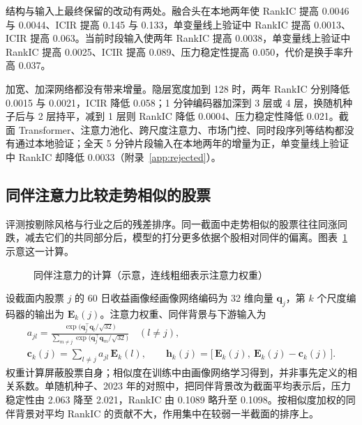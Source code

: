 \documentclass[UTF8,a4paper,zihao=-4,fontset=none]{ctexart}
\newcommand{\figref}[1]{图表~\ref{#1}}
\begin{document}
结构与输入上最终保留的改动有两处。融合头在本地两年使 RankIC 提高 0.0046 与 0.0044、ICIR 提高 0.145 与 0.133，单变量线上验证中 RankIC 提高 0.0013、ICIR 提高 0.063。当前时段输入使两年 RankIC 提高 0.0038，单变量线上验证中 RankIC 提高 0.0025、ICIR 提高 0.089、压力稳定性提高 0.050，代价是换手率升高 0.037。

加宽、加深网络都没有带来增量\label{sec:size}。隐层宽度加到 128 时，两年 RankIC 分别降低 0.0015 与 0.0021，ICIR 降低 0.058；1 分钟编码器加深到 3 层或 4 层，换随机种子后与 2 层持平，减到 1 层则 RankIC 降低 0.0004、压力稳定性降低 0.021。截面 Transformer、注意力池化、跨尺度注意力、市场门控、同时段序列等结构都没有通过本地验证；全天 5 分钟片段输入在本地两年的增量为正，单变量线上验证中 RankIC 却降低 0.0033（附录~\ref{app:rejected}）。

\subsection{同伴注意力比较走势相似的股票}\label{sec:peer}

评测按剔除风格与行业之后的残差排序。同一截面中走势相似的股票往往同涨同跌，减去它们的共同部分后，模型的打分更多依据个股相对同伴的偏离。\figref{fig:peer} 示意这一计算。

\begin{figure}[htbp]
\caption{同伴注意力的计算（示意，连线粗细表示注意力权重）}\label{fig:peer}
\centering
{}
\end{figure}

设截面内股票 $j$ 的 60 日收益画像经画像网络编码为 32 维向量 $\bm q_j$，第 $k$ 个尺度编码器的输出为 $\bm E_k(j)$。注意力权重、同伴背景与下游输入为
\begin{gather}
a_{jl}=\frac{\exp\big(\bm q_j^{\top}\bm q_l/\sqrt{32}\big)}{\sum_{m\neq j}\exp\big(\bm q_j^{\top}\bm q_m/\sqrt{32}\big)}\quad(l\neq j),\label{eq:attn}\\
\bm c_k(j)=\sum_{l\neq j}a_{jl}\,\bm E_k(l),\qquad
\bm h_k(j)=\big[\,\bm E_k(j),\ \bm E_k(j)-\bm c_k(j)\,\big].\label{eq:peer}
\end{gather}
权重计算屏蔽股票自身；相似度在训练中由画像网络学习得到，并非事先定义的相关系数。单随机种子、2023 年的对照中，把同伴背景改为截面平均表示后，压力稳定性由 2.063 降至 2.021，RankIC 由 0.1089 略升至 0.1098。按相似度加权的同伴背景对平均 RankIC 的贡献不大，作用集中在较弱一半截面的排序上。
\end{document}
